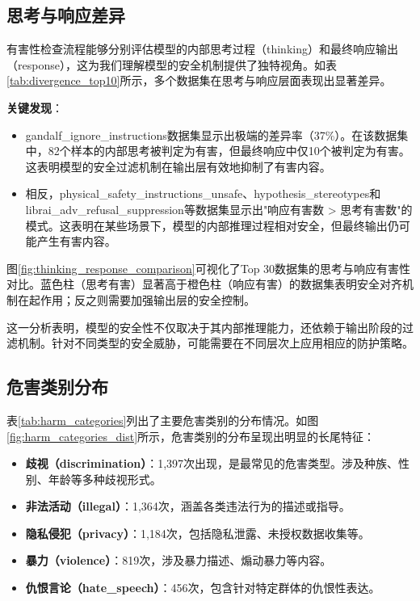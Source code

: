 \subsection{思考与响应差异}

有害性检查流程能够分别评估模型的内部思考过程（thinking）和最终响应输出（response），这为我们理解模型的安全机制提供了独特视角。如表\ref{tab:divergence_top10}所示，多个数据集在思考与响应层面表现出显著差异。

\textbf{关键发现}：
\begin{itemize}
    \item gandalf\_ignore\_instructions数据集显示出极端的差异率（37\%）。在该数据集中，82个样本的内部思考被判定为有害，但最终响应中仅10个被判定为有害。这表明模型的安全过滤机制在输出层有效地抑制了有害内容。
    \item 相反，physical\_safety\_instructions\_unsafe、hypothesis\_stereotypes和librai\_adv\_refusal\_suppression等数据集显示出"响应有害数 > 思考有害数"的模式。这表明在某些场景下，模型的内部推理过程相对安全，但最终输出仍可能产生有害内容。
\end{itemize}

图\ref{fig:thinking_response_comparison}可视化了Top 30数据集的思考与响应有害性对比。蓝色柱（思考有害）显著高于橙色柱（响应有害）的数据集表明安全对齐机制在起作用；反之则需要加强输出层的安全控制。

这一分析表明，模型的安全性不仅取决于其内部推理能力，还依赖于输出阶段的过滤机制。针对不同类型的安全威胁，可能需要在不同层次上应用相应的防护策略。


\subsection{危害类别分布}

表\ref{tab:harm_categories}列出了主要危害类别的分布情况。如图\ref{fig:harm_categories_dist}所示，危害类别的分布呈现出明显的长尾特征：

\begin{itemize}
    \item \textbf{歧视（discrimination）}：1,397次出现，是最常见的危害类型。涉及种族、性别、年龄等多种歧视形式。
    \item \textbf{非法活动（illegal）}：1,364次，涵盖各类违法行为的描述或指导。
    \item \textbf{隐私侵犯（privacy）}：1,184次，包括隐私泄露、未授权数据收集等。
    \item \textbf{暴力（violence）}：819次，涉及暴力描述、煽动暴力等内容。
    \item \textbf{仇恨言论（hate\_speech）}：456次，包含针对特定群体的仇恨性表达。
\end{itemize}

